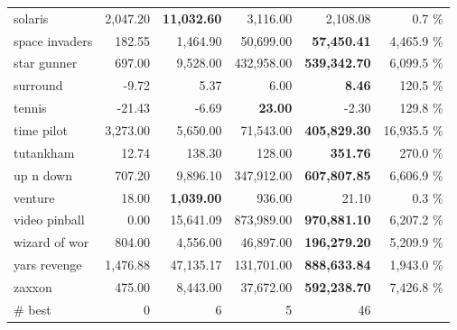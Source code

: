 \begin{center}
\begin{tabularx}{0.750000\textwidth}{X| r r r r r}
solaris &2,047.20 & \textbf{11,032.60} & 3,116.00 & 2,108.08 & 0.7 \%\\
space invaders &182.55 & 1,464.90 & 50,699.00 & \textbf{57,450.41} & 4,465.9 \%\\
star gunner &697.00 & 9,528.00 & 432,958.00 & \textbf{539,342.70} & 6,099.5 \%\\
surround &-9.72 & 5.37 & 6.00 & \textbf{8.46} & 120.5 \%\\
tennis &-21.43 & -6.69 & \textbf{23.00} & -2.30 & 129.8 \%\\
time pilot &3,273.00 & 5,650.00 & 71,543.00 & \textbf{405,829.30} & 16,935.5 \%\\
tutankham &12.74 & 138.30 & 128.00 & \textbf{351.76} & 270.0 \%\\
up n down &707.20 & 9,896.10 & 347,912.00 & \textbf{607,807.85} & 6,606.9 \%\\
venture &18.00 & \textbf{1,039.00} & 936.00 & 21.10 & 0.3 \%\\
video pinball &0.00 & 15,641.09 & 873,989.00 & \textbf{970,881.10} & 6,207.2 \%\\
wizard of wor &804.00 & 4,556.00 & 46,897.00 & \textbf{196,279.20} & 5,209.9 \%\\
yars revenge &1,476.88 & 47,135.17 & 131,701.00 & \textbf{888,633.84} & 1,943.0 \%\\
zaxxon &475.00 & 8,443.00 & 37,672.00 & \textbf{592,238.70} & 7,426.8 \%\\
\midrule
\# best & 0 & 6 & 5 & 46\\
\bottomrule
\end{tabularx}
\end{center}
